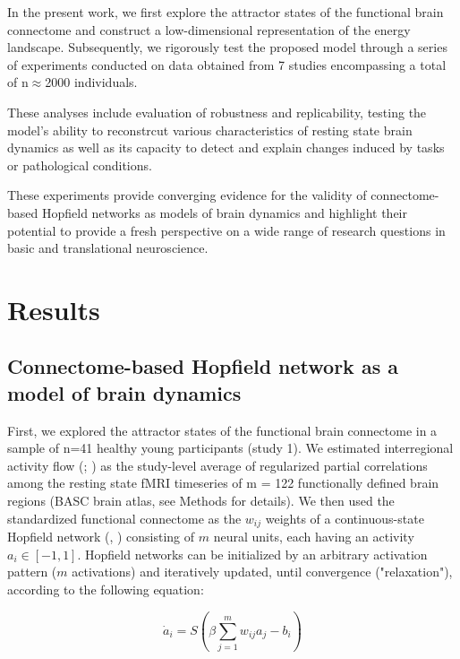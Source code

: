 \documentclass{article}
\begin{document}
In the present work, we first explore the attractor states of the functional brain connectome and construct a low-dimensional representation of the energy landscape.
Subsequently, we rigorously test the proposed model through a series of experiments conducted on data obtained from 7 studies encompassing a total of n$\approx$2000 individuals.

These analyses include evaluation of robustness and replicability, testing the model's ability to reconstrcut various characteristics of resting state brain dynamics as well as its capacity to detect and explain changes induced by tasks or pathological conditions.

These experiments provide converging evidence for the validity of connectome-based Hopfield networks as models of brain dynamics and highlight their potential to provide a fresh perspective on a wide range  of research questions in basic and translational neuroscience.

\section{Results}\label{Results}

\subsection{Connectome-based Hopfield network as a model of brain dynamics}\label{Connectome-based Hopfield network as a model of brain dynamics}

First, we explored the attractor states of the functional brain connectome in a sample of n=41 healthy young participants (study 1). We estimated interregional activity flow (\cite{Cole_2016}; \href{https://doi.org/10.1038/s41467-017-01000-w}{}) as the study-level average of regularized partial correlations among the resting state fMRI timeseries of m = 122 functionally defined brain regions (BASC brain atlas, see Methods for details). We then used the standardized functional connectome as the $w_{ij}$  weights of a continuous-state Hopfield network (\href{https://doi.org/10.1073/pnas.79.8.2554}{}, \href{https://doi.org/10.1162/neco.1994.6.3.459}{}) consisting of $m$ neural units, each having an activity $a_i \in [ -1,1]$. Hopfield networks can be initialized by an arbitrary activation pattern ($m$ activations) and iteratively updated, until convergence ("relaxation"), according to the following equation:

\begin{equation}
\label{hopfield-update}
\dot{a}_i = S(\beta \sum_{j=1}^m w_{ij}a_j - b_i)
\end{equation}
\end{document}
